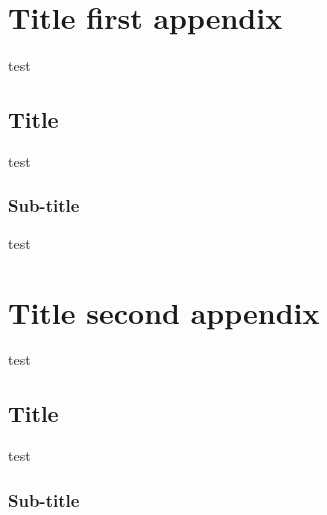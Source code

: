 \chapter{Title first appendix}

test

\section{Title}
test

\subsection{Sub-title}
test


\chapter{Title second appendix}

test

\section{Title}
test 

\subsection{Sub-title}




